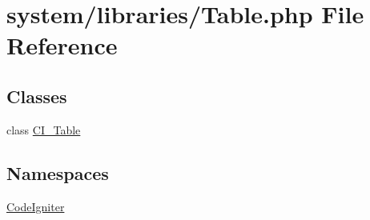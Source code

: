 \hypertarget{_table_8php}{}\section{system/libraries/\+Table.php File Reference}
\label{_table_8php}
\subsection*{Classes}
\begin{DoxyCompactItemize}
\item 
class \mbox{\hyperlink{class_c_i___table}{C\+I\+\_\+\+Table}}
\end{DoxyCompactItemize}
\subsection*{Namespaces}
\begin{DoxyCompactItemize}
\item 
 \mbox{\hyperlink{namespace_code_igniter}{Code\+Igniter}}
\end{DoxyCompactItemize}
